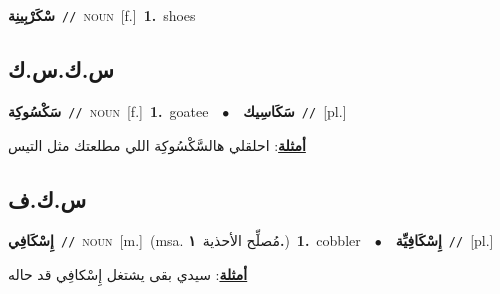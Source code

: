 \documentclass[10pt,a4paper,twoside]{article} %
\begin{document}
\begin{multicols}{2}
{\setlength\topsep{0pt}\textbf{\foreignlanguage{arabic}{سْكَرْبِينِة}}\ {\color{gray}\texttt{//}\color{black}}\ \textsc{noun}\ [f.]\ \textbf{1.}~shoes\ } \vspace{2mm}

\vspace{-3mm}
\subsection*{\color{blue}\foreignlanguage{arabic}{س.ك.س.ك}\color{blue}{ (ntws)}} 

{\setlength\topsep{0pt}\textbf{\foreignlanguage{arabic}{سَكْسُوكِة}}\ {\color{gray}\texttt{//}\color{black}}\ \textsc{noun}\ [f.]\ \textbf{1.}~goatee\ \ $\bullet$\ \ \setlength\topsep{0pt}\textbf{\foreignlanguage{arabic}{سَكَاسِيك}}\ {\color{gray}\texttt{//}\color{black}}\ [pl.]\  \begin{flushright}\color{gray}\foreignlanguage{arabic}{\textbf{\underline{\foreignlanguage{arabic}{أمثلة}}}: احلقلي هالسَّكْسُوكِة اللي مطلعتك مثل التيس}\end{flushright}\color{black}} \vspace{2mm}

\vspace{-3mm}
\subsection*{\color{blue}\foreignlanguage{arabic}{س.ك.ف}\color{blue}{}} 

{\setlength\topsep{0pt}\textbf{\foreignlanguage{arabic}{إِسْكَافِي}}\ {\color{gray}\texttt{//}\color{black}}\ \textsc{noun}\ [m.]\ \color{gray}(msa. \foreignlanguage{arabic}{مُصلِّح الأحذية}~\foreignlanguage{arabic}{\textbf{١.}})\color{black}\ \textbf{1.}~cobbler\ \ $\bullet$\ \ \setlength\topsep{0pt}\textbf{\foreignlanguage{arabic}{إِسْكَافِيِّة}}\ {\color{gray}\texttt{//}\color{black}}\ [pl.]\  \begin{flushright}\color{gray}\foreignlanguage{arabic}{\textbf{\underline{\foreignlanguage{arabic}{أمثلة}}}: سيدي بقى يشتغل إِسْكافِي قد حاله}\end{flushright}\color{black}} \vspace{2mm}


\end{multicols}
\end{document}
